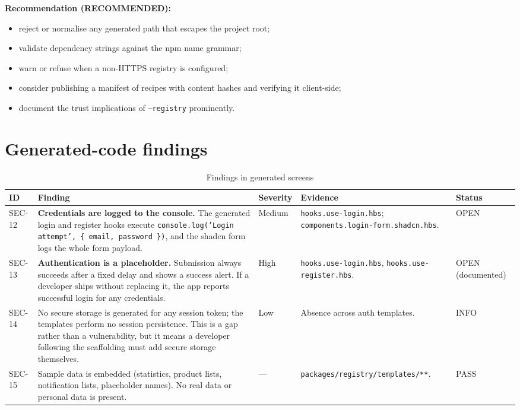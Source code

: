\textbf{Recommendation (RECOMMENDED):}
\begin{itemize}
  \item reject or normalise any generated path that escapes the project root;
  \item validate dependency strings against the npm name grammar;
  \item warn or refuse when a non-HTTPS registry is configured;
  \item consider publishing a manifest of recipes with content hashes and
        verifying it client-side;
  \item document the trust implications of \texttt{--registry} prominently.
\end{itemize}

\section{Generated-code findings}

\begin{longtable}{p{1.3cm}p{3.6cm}p{1.9cm}p{5.8cm}p{1.6cm}}
\caption{Findings in generated screens}\\
\toprule
\textbf{ID} & \textbf{Finding} & \textbf{Severity} & \textbf{Evidence} & \textbf{Status} \\
\midrule

SEC-12 & \textbf{Credentials are logged to the console.} The generated login and
register hooks execute \texttt{console.log('Login attempt', \{ email, password
\})}, and the shadcn form logs the whole form payload. & Medium &
\texttt{hooks.use-login.hbs}; \texttt{components.login-form.shadcn.hbs}. & OPEN \\
SEC-13 & \textbf{Authentication is a placeholder.} Submission always succeeds after
a fixed delay and shows a success alert. If a developer ships without replacing it,
the app reports successful login for any credentials. & High &
\texttt{hooks.use-login.hbs}, \texttt{hooks.use-register.hbs}. & OPEN (documented) \\
SEC-14 & No secure storage is generated for any session token; the templates
perform no session persistence. This is a gap rather than a vulnerability, but it
means a developer following the scaffolding must add secure storage themselves. &
Low & Absence across auth templates. & INFO \\
SEC-15 & Sample data is embedded (statistics, product lists, notification lists,
placeholder names). No real data or personal data is present. & --- &
\texttt{packages/registry/templates/**}. & PASS \\
\bottomrule
\end{longtable}

